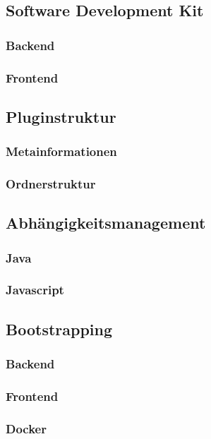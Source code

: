 \subsection{Software Development Kit}
\subsubsection{Backend}
\subsubsection{Frontend}
\subsection{Pluginstruktur}
\subsubsection{Metainformationen}
\subsubsection{Ordnerstruktur}
\subsection{Abhängigkeitsmanagement}
\subsubsection{Java}
\subsubsection{Javascript}
\subsection{Bootstrapping}
\subsubsection{Backend}
\subsubsection{Frontend}
\subsubsection{Docker}